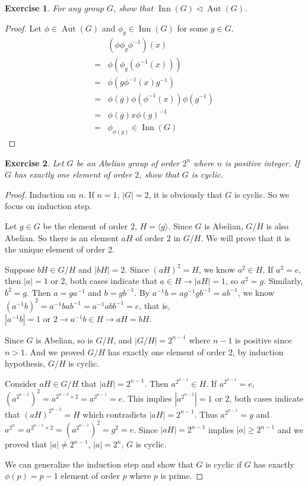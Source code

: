\documentclass[14pt]{extarticle}
\newtheorem{exercise}{Exercise}[section]
\newcommand{\inv}[1]{#1^{-1}}
\newcommand{\normalin}{\triangleleft}
\newcommand{\1}{\{ e \}}
\DeclareMathOperator{\Inn}{Inn}
\DeclareMathOperator{\Aut}{Aut}
\begin{document}
\begin{exercise}
  For any group $G$, show that $\Inn(G) \normalin \Aut(G)$.
\end{exercise}
\begin{proof}
  Let $\phi \in \Aut(G)$ and $\phi_g \in \Inn(G)$ for some $g \in G$.
  \begin{align*}
     & (\phi \phi_g \inv{\phi})(x) \\
    =& \phi(\phi_g(\inv{\phi}(x))) \\
    =& \phi(g\inv{\phi}(x)\inv{g}) \\
    =& \phi(g) \phi(\inv{\phi}(x)) \phi(\inv{g}) \\
    =& \phi(g) x \inv{\phi(g)} \\
    =& \phi_{\phi(g)} \in \Inn(G)
  \end{align*}
\end{proof}

\begin{exercise}
  Let $G$ be an Abelian group of order $2^n$ where $n$ is positive integer.
  If $G$ has exactly one element of order $2$, show that $G$ is cyclic.
\end{exercise}
\begin{proof}
  Induction on $n$. If $n = 1$, $|G| = 2$, it is obviously that $G$ is cyclic.
  So we focus on induction step.

  Let $g \in G$ be the element of order $2$, $H = \langle g \rangle$.
  Since $G$ is Abelian, $G/H$ is also Abelian.
  So there is an element $aH$ of order $2$ in $G/H$.
  We will prove that it is the unique element of order 2.

  Suppose $bH \in G/H$ and $|bH| = 2$.
  Since $(aH)^2 = H$, we know $a^2 \in H$.
  If $a^2 = e$, then $|a| = 1 \text{ or } 2$, both cases indicate that $a \in H \rightarrow |aH| = 1$,
  so $a^2 = g$. Similarly, $b^2 = g$. Then $a = g\inv{a}$ and $b = g\inv{b}$. 
  By $\inv{a}b = a\inv{g}g\inv{b} = a\inv{b}$,
  we know $(\inv{a}b)^2 = \inv{a}ba\inv{b} = \inv{a}ab\inv{b} = e$, that is,
  $|\inv{a}b| = 1 \text{ or } 2 \rightarrow \inv{a}b \in H \rightarrow aH = bH$.

  Since $G$ is Abelian, so is $G/H$, and $|G/H| = 2^{n - 1}$ where $n - 1$ is positive since $n > 1$.
  And we proved $G/H$ has exactly one element of order $2$, by induction hypothesis, $G/H$ is cyclic.

  Consider $aH \in G/H$ that $|aH| = 2^{n - 1}$. Then $a^{2^{n - 1}} \in H$.
  If $a^{2^{n - 1}} = e$, $(a^{2^{n - 2}})^2 = a^{2^{n - 2} \times 2} = a^{2^{n - 1}} = e$.
  This implies $|a^{2^{n - 2}}| = 1 \text{ or } 2$, both cases indicate that $(aH)^{2^{n - 2}} = H$
  which contradicts $|aH| = 2^{n - 1}$. 
  Thus $a^{2^{n - 1}} = g$ 
  and $a^{2^n} = a^{2^{n - 1} \times 2} = (a^{2^{n - 1}})^2 = g^2 = e$.
  Since $|aH| = 2^{n - 1}$ implies $|a| \ge 2^{n - 1}$ and we proved that $|a| \neq 2^{n - 1}$,
  $|a| = 2^n$, $G$ is cyclic.

  We can generalize the induction step
  and show that $G$ is cyclic 
  if $G$ has exactly $\phi(p) = p - 1$ element of order $p$ where $p$ is prime.
\end{proof}
\end{document}
